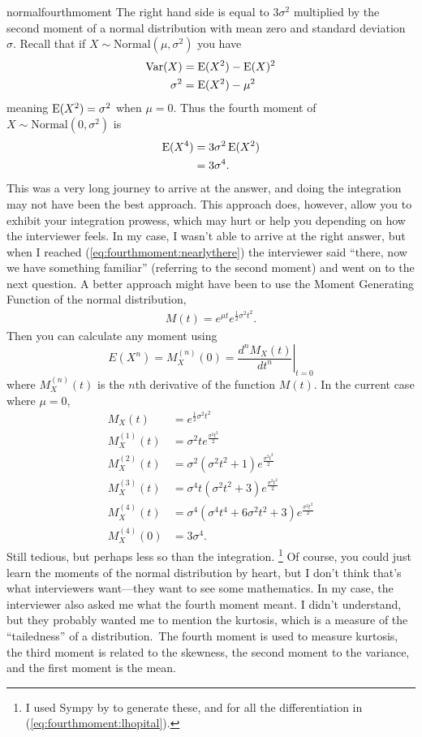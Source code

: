 \begin{answer}{normalfourthmoment}
The right hand side is equal to $3\sigma^2$ multiplied by the second moment of a normal distribution with mean zero and standard deviation $\sigma$.
Recall that if $X \sim \text{Normal}(\mu, \sigma^2)$ you have
\begin{align*}
  \operatorname{\mathrm{Var}}(X) &= \operatorname{\mathrm{E}}(X^2) - \operatorname{\mathrm{E}}(X)^2 \\
\sigma^2  &= \operatorname{\mathrm{E}}(X^2) - \mu^2
\end{align*}
meaning
$ \operatorname{\mathrm{E}}(X^2) = \sigma^2 $
when
$\mu=0$.
Thus the fourth moment of
$X \sim \text{Normal}\left(0, \sigma^2\right)$ is
\begin{align*}
\operatorname{\mathrm{E}}(X^4)
&=
3 \sigma^2 \operatorname{\mathrm{E}}(X^2)
\\&=
3 \sigma^4
\text{.}
\end{align*}
This was a very long journey to arrive at the answer, and doing the integration may not have been the best approach.
This approach does, however, allow you to exhibit your integration prowess, which may hurt or help you depending on how the interviewer feels.
In my case, I wasn't able to arrive at the right answer, but when I reached  (\ref{eq:fourthmoment:nearlythere}) the interviewer said ``there, now we have something familiar'' (referring to the second moment) and went on to the next question.
A better approach might have been to use the Moment Generating Function of the normal distribution,
\begin{align*}
  M(t) =
  e^{\mu t}
  e^{\frac{1}{2}\sigma^2 t^2}
  \text{.}
\end{align*}
Then you can calculate any moment using
\[
E \left( X^n \right) = M_X^{(n)}(0) = \left. \frac{d^n M_X (t)}{dt^n}\right|_{t=0}
\]
where $M_X^{(n)}(t)$ is the $n$th derivative of the function $M(t)$.
In the current case where $\mu=0$,
\begin{align*}
  M_X(t) &=
  e^{\frac{1}{2}\sigma^2 t^2}\\
M_X^{(1)}(t) &=
\sigma^{2} t e^{\frac{\sigma^{2} t^{2}}{2}}
\\
M_X^{(2)}(t) &=
\sigma^{2} \left(\sigma^{2} t^{2} + 1\right) e^{\frac{\sigma^{2} t^{2}}{2}}
\\
M_X^{(3)}(t) &=
\sigma^{4} t \left(\sigma^{2} t^{2} + 3\right) e^{\frac{\sigma^{2} t^{2}}{2}}
\\
M_X^{(4)}(t) &=
\sigma^{4} \left(\sigma^{4} t^{4} + 6 \sigma^{2} t^{2} + 3\right) e^{\frac{\sigma^{2} t^{2}}{2}}
\\
M_X^{(4)}(0) &=
3\sigma^{4}
\text{.}
\end{align*}
Still tedious, but perhaps less so than the integration.%
\footnote{I used Sympy by \citet{Sympy} to generate these, and for all the differentiation in (\ref{eq:fourthmoment:lhopital}).}
Of course, you could just learn the moments of the normal distribution by heart, but I don't think that's what interviewers want---they want to see some mathematics.
In my case, the interviewer also asked me what the fourth moment meant.
I didn't understand, but they probably wanted me to mention the kurtosis, which is a measure of the ``tailedness'' of a distribution.\
The fourth moment is used to measure kurtosis,
the third moment is related to the skewness,
the second moment to the variance, and the first moment is the mean.



\end{answer}

